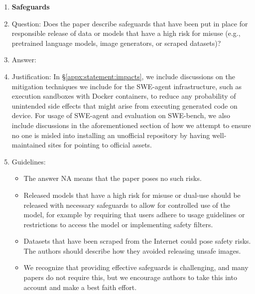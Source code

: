 \begin{enumerate}
\item {\bf Safeguards}
    \item[] Question: Does the paper describe safeguards that have been put in place for responsible release of data or models that have a high risk for misuse (e.g., pretrained language models, image generators, or scraped datasets)?
    \item[] Answer: \answerYes{}
    \item[] Justification: In \S\ref{appx:statement:impacts}, we include discussions on the mitigation techniques we include for the SWE-agent infrastructure, such as execution sandboxes with Docker containers, to reduce any probability of unintended side effects that might arise from executing generated code on device.
    For usage of SWE-agent and evaluation on SWE-bench, we also include discussions in the aforementioned section of how we attempt to ensure no one is misled into installing an unofficial repository by having well-maintained sites for pointing to official assets.
    \item[] Guidelines:
    \begin{itemize}
        \item The answer NA means that the paper poses no such risks.
        \item Released models that have a high risk for misuse or dual-use should be released with necessary safeguards to allow for controlled use of the model, for example by requiring that users adhere to usage guidelines or restrictions to access the model or implementing safety filters. 
        \item Datasets that have been scraped from the Internet could pose safety risks. The authors should describe how they avoided releasing unsafe images.
        \item We recognize that providing effective safeguards is challenging, and many papers do not require this, but we encourage authors to take this into account and make a best faith effort.
    \end{itemize}


\end{enumerate}
